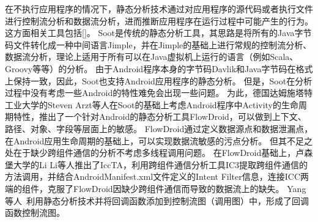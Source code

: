 在不执行应用程序的情况下，静态分析技术通过对应用程序的源代码或者执行文件进行控制流分析和数据流分析，进而推断应用程序在运行过程中可能产生的行为。
这方面相关工具包括[]。
Soot\cite{vallee1999soot}是传统的静态分析工具，其思路是将所有的Java字节码文件转化成一种中间语言Jimple，并在Jimple的基础上进行常规的控制流分析、数据流分析，理论上适用于所有可以在Java虚拟机上运行的语言（例如Scala、Groovy等等）的分析。
由于Android程序本身的字节码Davlik和Java字节码在格式上保持一致，因此，Soot也支持Android应用程序的静态分析。
但是，Soot在分析过程中没有考虑一些Android的特性难免会出现一些问题。
为此，德国达姆施塔特工业大学的Steven Arzt等人在Soot的基础上考虑Android程序中Activity的生命周期特性，推出了一个针对Android的静态分析工具FlowDroid\cite{arzt2014flowdroid}，可以做到上下文、路径、对象、字段等层面上的敏感。
FlowDroid通过定义数据源点和数据泄漏点，在Android应用生命周期的基础上，可以实现数据流敏感的污点分析。
但其不足之处在于缺少跨组件通信的分析不考虑多线程调用问题。
在FlowDroid基础上，卢森堡大学的Li Li等人推出了IccTA\cite{iccta}，利用跨组件通信分析工具IC3提取跨组件通信的方法调用，并结合AndroidManifest.xml文件定义的Intent Filter信息，连接ICC两端的组件，克服了FlowDroid因缺少跨组件通信而导致的数据流上的缺失。
Yang等人~\cite{yang2015static}利用静态分析技术并将回调函数添加到控制流图（调用图）中，形成了回调函数控制流图。





